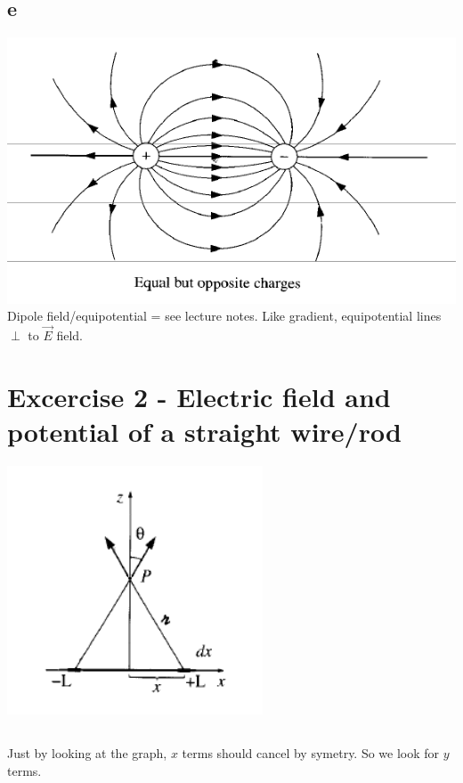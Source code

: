 \documentclass{article}
\begin{document}
\subsection{e}
\includegraphics[scale=0.7]{ex1-e}
Dipole field/equipotential = see lecture notes.
Like gradient, equipotential lines \(\perp\) to \(\vec{E}\) field.

\section{Excercise 2 - Electric field and potential of a straight wire/rod}

\includegraphics{ex2}

\subsection{}
Just by looking at the graph, \(x\) terms should cancel by symetry. So we look
for \(y\) terms.
\end{document}
